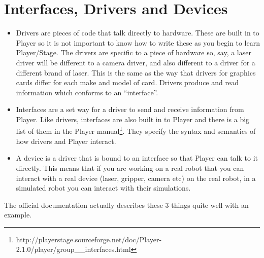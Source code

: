 \documentclass[a4paper]{report}
\newcommand{\plst}{Player/Stage\xspace}
\newcommand{\pl}{Player\xspace}
\begin{document}
\section{Interfaces, Drivers and Devices} \label{sec:interfaceDriverDevices}
\begin{itemize}
\item Drivers are pieces of code that talk directly to hardware. These are built in to \pl so it is not important to know how to write these as you begin to learn \plst. The drivers are specific to a piece of hardware so, say, a laser driver will be different to a camera driver, and also different to a driver for a different brand of laser. This is the same as the way that drivers for graphics cards differ for each make and model of card. Drivers produce and read information which conforms to an ``interface''.

\item Interfaces are a set way for a driver to send and receive information from \pl. Like drivers, interfaces are also built in to \pl and there is a big list of them in the \pl manual\footnote{http://playerstage.sourceforge.net/doc/\pl-2.1.0/player/group\_\_interfaces.html}. They specify the syntax and semantics of how drivers and \pl interact.
	
\item A device is a driver that is bound to an interface so that \pl can talk to it directly. This means that if you are working on a real robot that you can interact with a real device (laser, gripper, camera etc) on the real robot, in a simulated robot you can interact with their simulations. 
\end{itemize}

The official documentation actually describes these 3 things quite well with an example.
\end{document}
